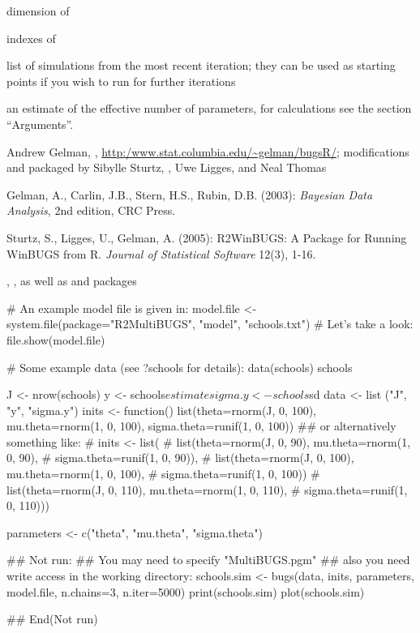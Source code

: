 \begin{Value}
\begin{ldescription}
\item[\code{dimension.short}] dimension of 
\item[\code{indexes.short}] indexes of 
\item[\code{last.values}] list of simulations from the most recent
iteration; they can be used as starting points if you wish to run
 for further iterations
\item[\code{pD}] an estimate of the effective number of parameters, for
calculations see the section ``Arguments''.
\item[\code{DIC}] 
\end{ldescription}
\end{Value}
%
\begin{Author}\relax
Andrew Gelman, ,
\url{http:/www.stat.columbia.edu/~gelman/bugsR/}; modifications and
packaged by Sibylle Sturtz, ,
Uwe Ligges, and Neal Thomas
\end{Author}
%
\begin{References}\relax
Gelman, A., Carlin, J.B., Stern, H.S., Rubin, D.B. (2003):
\emph{Bayesian Data Analysis}, 2nd edition, CRC Press.

Sturtz, S., Ligges, U., Gelman, A. (2005):
R2WinBUGS: A Package for Running WinBUGS from R.
\emph{Journal of Statistical Software} 12(3), 1-16.
\end{References}
%
\begin{SeeAlso}\relax
{}, , as well as
 and  packages
\end{SeeAlso}
%
\begin{Examples}
\begin{ExampleCode}
# An example model file is given in:
model.file <- system.file(package="R2MultiBUGS", "model", "schools.txt")
# Let's take a look:
file.show(model.file)

# Some example data (see ?schools for details):
data(schools)
schools

J <- nrow(schools)
y <- schools$estimate
sigma.y <- schools$sd
data <- list ("J", "y", "sigma.y")
inits <- function(){
    list(theta=rnorm(J, 0, 100), mu.theta=rnorm(1, 0, 100),
         sigma.theta=runif(1, 0, 100))
}
## or alternatively something like:
# inits <- list(
#   list(theta=rnorm(J, 0, 90), mu.theta=rnorm(1, 0, 90),
#        sigma.theta=runif(1, 0, 90)),
#   list(theta=rnorm(J, 0, 100), mu.theta=rnorm(1, 0, 100),
#        sigma.theta=runif(1, 0, 100))
#   list(theta=rnorm(J, 0, 110), mu.theta=rnorm(1, 0, 110),
#        sigma.theta=runif(1, 0, 110)))

parameters <- c("theta", "mu.theta", "sigma.theta")

## Not run:
## You may need to specify "MultiBUGS.pgm"
## also you need write access in the working directory:
schools.sim <- bugs(data, inits, parameters, model.file,
    n.chains=3, n.iter=5000)
print(schools.sim)
plot(schools.sim)

## End(Not run)
\end{ExampleCode}
\end{Examples}
